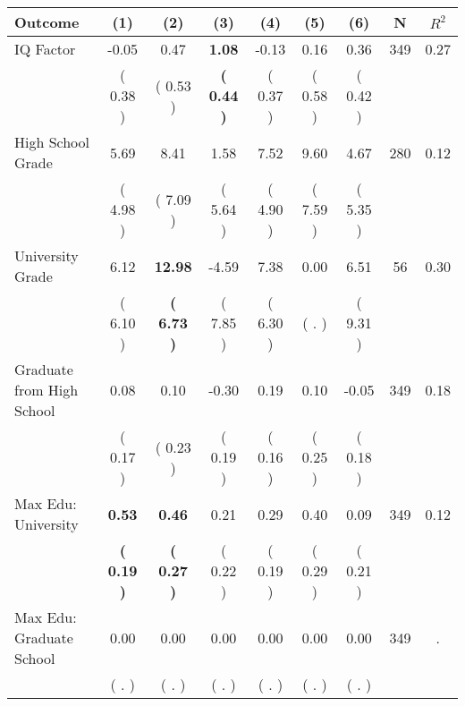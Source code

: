 \begin{tabular}{lcccccccc}
\toprule
 \textbf{Outcome} & \textbf{(1)} & \textbf{(2)} & \textbf{(3)} & \textbf{(4)} & \textbf{(5)} & \textbf{(6)} & \textbf{N} & \textbf{$ R^2$} \\
\midrule
IQ Factor &     -0.05 &      0.47 & \textbf{     1.08} &     -0.13 &      0.16 &      0.36 & 349 &       0.27 \\ 
 & (     0.38 ) & (     0.53 ) & \textbf{(     0.44 )} & (     0.37 ) & (     0.58 ) & (     0.42 ) & \\
High School Grade &      5.69 &      8.41 &      1.58 &      7.52 &      9.60 &      4.67 & 280 &       0.12 \\ 
 & (     4.98 ) & (     7.09 ) & (     5.64 ) & (     4.90 ) & (     7.59 ) & (     5.35 ) & \\
University Grade &      6.12 & \textbf{    12.98} &     -4.59 &      7.38 &      0.00 &      6.51 & 56 &       0.30 \\ 
 & (     6.10 ) & \textbf{(     6.73 )} & (     7.85 ) & (     6.30 ) & (        . ) & (     9.31 ) & \\
Graduate from High School &      0.08 &      0.10 &     -0.30 &      0.19 &      0.10 &     -0.05 & 349 &       0.18 \\ 
 & (     0.17 ) & (     0.23 ) & (     0.19 ) & (     0.16 ) & (     0.25 ) & (     0.18 ) & \\
Max Edu: University & \textbf{     0.53} & \textbf{     0.46} &      0.21 &      0.29 &      0.40 &      0.09 & 349 &       0.12 \\ 
 & \textbf{(     0.19 )} & \textbf{(     0.27 )} & (     0.22 ) & (     0.19 ) & (     0.29 ) & (     0.21 ) & \\
Max Edu: Graduate School &      0.00 &      0.00 &      0.00 &      0.00 &      0.00 &      0.00 & 349 &          . \\ 
 & (        . ) & (        . ) & (        . ) & (        . ) & (        . ) & (        . ) & \\
\bottomrule
\end{tabular}
